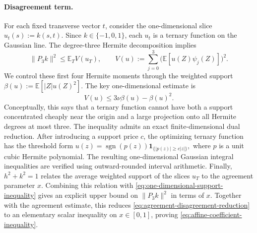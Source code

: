 \paragraph{Disagreement term.}
For each fixed transverse vector \(t\), consider the one-dimensional slice
\(u_t(s):=k(s,t)\). Since \(k\in\{-1,0,1\}\), each \(u_t\) is a ternary function on the Gaussian line. The degree-three Hermite decomposition implies
\[
    \|P_3k\|^2
    \leq
    \mathbb E_T V(u_T),
    \qquad
    V(u):=
    \sum_{j=0}^3
    \bigl(\mathbb E[u(Z)\psi_j(Z)]\bigr)^2.
\]
We control these first four Hermite moments through the weighted support
\(\beta(u):=\mathbb E[|Z|u(Z)^2]\). The key one-dimensional estimate is
\begin{equation}
    V(u)\leq 3\nu\beta(u)-\beta(u)^2.
    \label{eq:one-dimensional-support-inequality}
\end{equation}
Conceptually, this says that a ternary function cannot have both a support concentrated cheaply near the origin and a large projection onto all Hermite degrees at most three. The inequality admits an exact finite-dimensional dual reduction. After introducing a support price \(c\), the optimizing ternary function has the threshold form
\(
    u(z)=\operatorname{sgn}(p(z))
    \mathbf 1_{\{|p(z)|\geq c|z|\}},
\)
where \(p\) is a unit cubic Hermite polynomial. The resulting one-dimensional Gaussian integral inequalities are verified using outward-rounded interval arithmetic. Finally, \(h^2+k^2=1\) relates the average weighted support of the slices \(u_T\) to the agreement parameter \(x\). Combining this relation with
\eqref{eq:one-dimensional-support-inequality} gives an explicit upper bound on
\(\|P_3k\|^2\) in terms of \(x\). Together with the agreement estimate, this reduces
\eqref{eq:agreement-disagreement-reduction} to an elementary scalar inequality on
\(x\in[0,1]\), proving \eqref{eq:affine-coefficient-inequality}.







